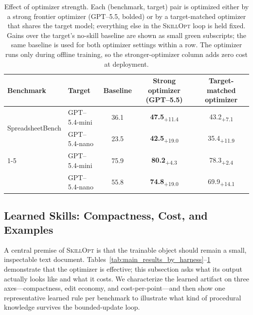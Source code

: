 \documentclass{llmxive}
\providecommand{\ourmethod}{\textsc{SkillOpt}\xspace}
\providecommand{\dvalp}[2]{\hphantom{\textsubscript{+#2}}#1\textsubscript{+#2}}
\providecommand{\arraystretch}{1.0}
\begin{document}
\begin{table}[t]
\centering
\footnotesize
\setlength{\tabcolsep}{4pt}
\renewcommand{\arraystretch}{0.95}
\begin{tabular}{l l c c c}
\toprule
\textbf{Benchmark} & \textbf{Target} & \textbf{Baseline} & \textbf{Strong optimizer (GPT--5.5)} & \textbf{Target-matched optimizer} \\
\midrule
\multirow{2}{*}{SpreadsheetBench} & GPT--5.4-mini & 36.1 & \dvalp{\textbf{47.5}}{11.4} & \dvalp{43.2}{7.1}  \\
                                  & GPT--5.4-nano & 23.5 & \dvalp{\textbf{42.5}}{19.0} & \dvalp{35.4}{11.9} \\
\cmidrule(lr){1-5}
\multirow{2}{*}{SearchQA}         & GPT--5.4-mini & 75.9 & \dvalp{\textbf{80.2}}{4.3}  & \dvalp{78.3}{2.4}  \\
                                  & GPT--5.4-nano & 55.8 & \dvalp{\textbf{74.8}}{19.0} & \dvalp{69.9}{14.1} \\
\bottomrule
\end{tabular}
\caption{Effect of optimizer strength. Each (benchmark, target) pair is optimized either by a strong frontier optimizer (GPT--5.5, bolded) or by a target-matched optimizer that shares the target model; everything else in the \ourmethod{} loop is held fixed. Gains over the target's no-skill baseline are shown as small green subscripts; the same baseline is used for both optimizer settings within a row. The optimizer runs only during offline training, so the stronger-optimizer column adds zero cost at deployment.}
\label{tab:teacher_model_ablation}
\end{table}

\subsection{Learned Skills: Compactness, Cost, and Examples}
\label{sec:learned_skills}

A central premise of \ourmethod{} is that the trainable object should remain a small, inspectable text document. Tables~\ref{tab:main_results_by_harness}--\ref{tab:teacher_model_ablation} demonstrate that the optimizer is effective; this subsection asks what its output actually looks like and what it costs. We characterize the learned artifact on three axes---compactness, edit economy, and cost-per-point---and then show one representative learned rule per benchmark to illustrate what kind of procedural knowledge survives the bounded-update loop.
\end{document}
